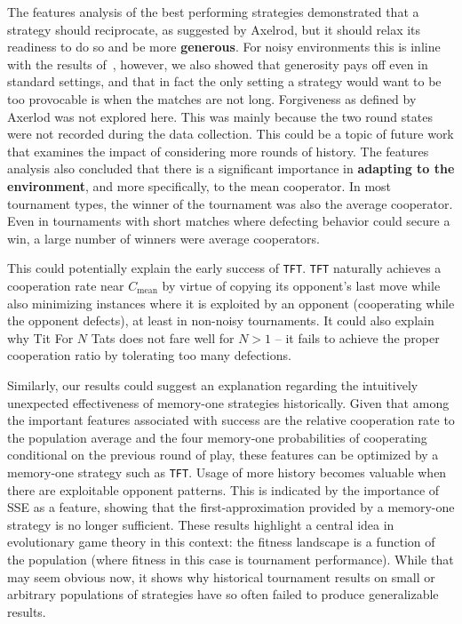 \documentclass{article}
\def\TFT{\texttt{TFT}}
\begin{document}
The features analysis of the best performing strategies demonstrated that a
strategy should reciprocate, as suggested by Axelrod, but it should relax its
readiness to do so and be more \textbf{generous}. For noisy environments this is
inline with the results of~\cite{Bendor1991, Donninger1986, Molander1985,
Hammerstein1984}, however, we also showed that generosity pays off even in
standard settings, and that in fact the only setting a strategy would want to be
too provocable is when the matches are not long.
Forgiveness as defined by
Axerlod was not explored here. This was mainly because the two round states were
not recorded during the data collection. This could be a topic of future work
that examines the impact of considering more rounds of history.
The features analysis also concluded that
there is a significant importance in \textbf{adapting to the environment}, and
more specifically, to the mean cooperator. 
In most tournament types, the winner of the tournament was also the average
cooperator. Even in tournaments with short matches where defecting behavior
could secure a win, a large number of winners were average cooperators.

This could potentially explain the early success of \TFT. \TFT{} naturally achieves
a cooperation rate near $C_{\text{mean}}$ by virtue of copying its opponent's
last move while also minimizing instances where it is exploited by an opponent
(cooperating while the opponent defects), at least in non-noisy tournaments. It
could also explain why Tit For \(N\) Tats does not fare well for $N > 1$ -- it
fails to achieve the proper cooperation ratio by tolerating too many defections.

Similarly, our results could suggest an explanation regarding the intuitively
unexpected effectiveness of memory-one strategies historically. Given that among
the important features associated with success are the relative cooperation rate
to the population average and the four memory-one probabilities of cooperating
conditional on the previous round of play, these features can be optimized by a
memory-one strategy such as \TFT. Usage of more history becomes valuable when
there are exploitable opponent patterns. This is indicated by the importance of
SSE as a feature, showing that the first-approximation provided by a memory-one
strategy is no longer sufficient.
These results highlight a central idea in evolutionary game theory in this
context: the fitness landscape is a function of the population (where fitness in
this case is tournament performance). While that may seem obvious now, it shows
why historical tournament results on small or arbitrary populations of
strategies have so often failed to produce generalizable results.
\end{document}

